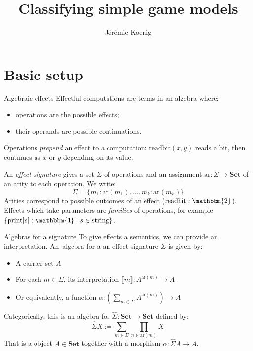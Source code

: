 \documentclass{beamer}
\title{Classifying simple game models}
\author{J\'er\'emie Koenig}
\newcommand{\fun}[1]{\mathrm{#1}}
\newcommand{\cat}[1]{\mathbf{#1}}
\begin{document}
\begin{frame}
\titlepage
\end{frame}

\section{Basic setup}

\begin{frame}{Algebraic effects} %
Effectful computations are terms in an algebra where: \pause
\begin{itemize}
  \item operations are the possible effects;
  \item their operands are possible continuations.
\end{itemize}
\pause
Operations \emph{prepend} an effect to a computation:
$\fun{readbit}(x, y)$ reads a bit,
then continues as $x$ or $y$ depending on its value.
\pause

\vfill
An \emph{effect signature} gives a set $\Sigma$ of operations
and an assignment $\fun{ar} : \Sigma \rightarrow \cat{Set}$
of an arity to each operation.
We write:
\[
    \Sigma = \{ m_1 : \fun{ar}(m_1), \ldots, m_k : \fun{ar}(m_k) \}
\]
\pause
Arities correspond to possible outcomes of an effect
($\fun{readbit} : \mathbbm{2}$).
Effects which take parameters are \emph{families}
of operations, for example
$\{ \fun{print}[s] : \mathbbm{1} \mid s \in \fun{string} \}$.
\end{frame}

\begin{frame}{Algebras for a signature} %
To give effects a semantics,
we can provide an interpretation.
An~algebra for a an effect signature $\Sigma$
is given by:
\begin{itemize}
  \item A carrier set $A$
  \item For each $m \in \Sigma$, its interpretation
    $\llbracket m \rrbracket : A^{\fun{ar}(m)} \rightarrow A$
  \pause
  \item Or equivalently, a function
  $\alpha :
     \left(\sum_{m \in \Sigma} A^{\fun{ar}(m)} \right)
     \rightarrow A$
\end{itemize}
\pause

\vfill
Categorically, this is an algebra for
$\hat{\Sigma} : \cat{Set} \rightarrow \cat{Set}$
defined by:
\[
    \hat{\Sigma} X := \sum_{m \in \Sigma} \prod_{n \in \fun{ar}(m)} X \,
\]
That is a object $A \in \cat{Set}$
together with a morphism $\alpha : \hat{\Sigma} A \rightarrow A$.
\end{frame}
\end{document}
